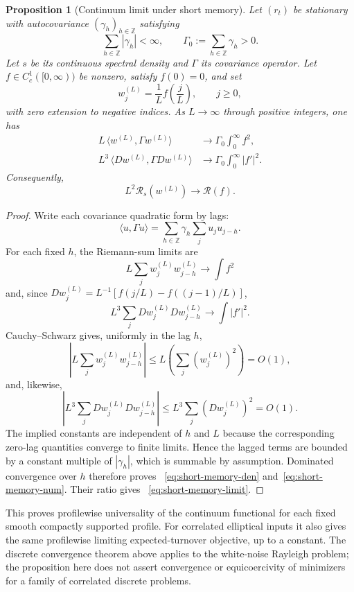 \documentclass[11pt]{amsart}
\newtheorem{proposition}[theorem]{Proposition}
\theoremstyle{definition}
\theoremstyle{remark}
\newcommand{\Rcal}{\mathcal R}
\begin{document}
\begin{proposition}[Continuum limit under short memory]\label{prop:short-memory}
Let $(r_t)$ be stationary with autocovariance $(\gamma_h)_{h\in\mathbb Z}$
satisfying
\[
 \sum_{h\in\mathbb Z}|\gamma_h|<\infty,
 \qquad
 \Gamma_0:=\sum_{h\in\mathbb Z}\gamma_h>0.
\]
Let $s$ be its continuous spectral density and $\Gamma$ its covariance
operator.
Let $f\in C_c^1([0,\infty))$ be nonzero, satisfy $f(0)=0$, and set
\[
 w_j^{(L)}=\frac1L f\!\left(\frac jL\right),
 \qquad j\geq0,
\]
with zero extension to negative indices. As $L\to\infty$ through positive
integers, one has
\begin{align}
 L\,\langle w^{(L)},\Gamma w^{(L)}\rangle
 &\longrightarrow \Gamma_0\int_0^\infty f^2,\label{eq:short-memory-den}\\
 L^3\,\langle Dw^{(L)},\Gamma Dw^{(L)}\rangle
 &\longrightarrow \Gamma_0\int_0^\infty |f'|^2.\label{eq:short-memory-num}
\end{align}
Consequently,
\begin{equation}\label{eq:short-memory-limit}
 L^2\Rcal_s(w^{(L)})\longrightarrow\Rcal(f).
\end{equation}
\end{proposition}
\begin{proof}
Write each covariance quadratic form by lags:
\[
 \langle u,\Gamma u\rangle
 =\sum_{h\in\mathbb Z}\gamma_h\sum_j u_j u_{j-h}.
\]
For each fixed $h$, the Riemann-sum limits are
\[
 L\sum_j w_j^{(L)}w_{j-h}^{(L)}\longrightarrow\int f^2
\]
and, since
$Dw_j^{(L)}=L^{-1}[f(j/L)-f((j-1)/L)]$,
\[
 L^3\sum_j Dw_j^{(L)}Dw_{j-h}^{(L)}\longrightarrow\int|f'|^2.
\]
Cauchy--Schwarz gives, uniformly in the lag $h$,
\[
\left|L\sum_j w_j^{(L)}w_{j-h}^{(L)}\right|
\leq L\left(\sum_j (w_j^{(L)})^2\right)=O(1),
\]
and, likewise,
\[
\left|L^3\sum_j Dw_j^{(L)}Dw_{j-h}^{(L)}\right|
\leq L^3\sum_j (Dw_j^{(L)})^2=O(1).
\]
The implied constants are independent of $h$ and $L$ because the corresponding
zero-lag quantities converge to finite limits. Hence the lagged terms are
bounded by a constant multiple of $|\gamma_h|$, which is summable by assumption.
Dominated convergence over $h$ therefore proves
~\eqref{eq:short-memory-den} and~\eqref{eq:short-memory-num}. Their ratio gives
~\eqref{eq:short-memory-limit}.
\end{proof}

This proves profilewise universality of the continuum functional for each
fixed smooth compactly supported profile. For correlated elliptical inputs it
also gives the same profilewise limiting expected-turnover objective, up to a
constant. The discrete convergence theorem above applies to the white-noise
Rayleigh problem; the proposition here does not assert convergence or
equicoercivity of minimizers for a family of correlated discrete problems.
\end{document}
